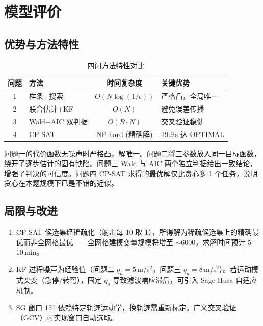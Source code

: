 \section{模型评价}\label{sec:evaluation}

\subsection{优势与方法特性}

\begin{table}[htbp]
    \centering
    \caption{四问方法特性对比}
    \label{tab:method_compare}
    \begin{tabular}{@{}clcl@{}}
        \toprule
        问题 & 方法 & 时间复杂度 & 关键优势 \\
        \midrule
        1 & 样条+搜索 & $O(N\log(1/\epsilon))$ & 严格凸，全局唯一 \\
        2 & 联合估计+KF & $O(N)$ & 避免误差传播 \\
        3 & Wald+AIC 双判据 & $O(B \cdot N)$ & 交叉验证稳健 \\
        4 & CP-SAT & NP-hard (精确解) & 19.9\,s 达 OPTIMAL \\
        \bottomrule
    \end{tabular}
\end{table}

问题一的代价函数无噪声时严格凸，解唯一。问题二将三参数放入同一目标函数，绕开了逐步估计的固有缺陷。问题三 Wald 与 AIC 两个独立判据给出一致结论，增强了判决的可信度。问题四 CP-SAT 求得的最优解仅比贪心多 1 个任务，说明贪心在本题规模下已是不错的近似。

\subsection{局限与改进}

\begin{enumerate}
    \item CP-SAT 候选集经稀疏化（射击每 10 取 1），所得解为稀疏候选集上的精确最优而非全网格最优——全网格建模变量规模将增至 $\sim 6000$，求解时间预计 5--10\,min。
    \item KF 过程噪声为经验值（问题二 $q_a = 5$\,m/s$^2$，问题三 $q_a = 8$\,m/s$^2$）。若运动模式突变（急停/转弯），固定 $q_a$ 导致滤波响应滞后，可引入 Sage-Husa 自适应机制。
    \item SG 窗口 151 依赖特定轨迹运动学，换轨迹需重新标定。广义交叉验证（GCV）可实现窗口自动选取。
\end{enumerate}
